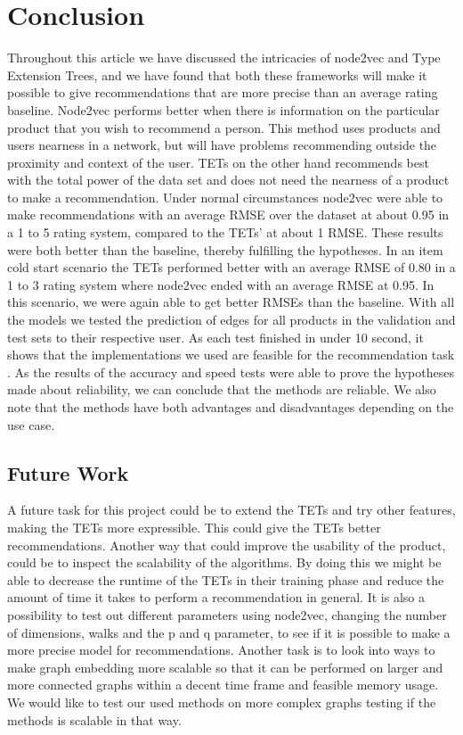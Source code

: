 \section{Conclusion}
Throughout this article we have discussed the intricacies of node2vec and Type Extension Trees, and we have found that both these frameworks will make it possible to give recommendations that are more precise than an average rating baseline.
Node2vec performs better when there is information on the particular product that you wish to recommend a person.
This method uses products and users nearness in a network, but will have problems recommending outside the proximity and context of the user.
TETs on the other hand recommends best with the total power of the data set and does not need the nearness of a product to make a recommendation.
Under normal circumstances node2vec were able to make recommendations with an average RMSE over the dataset at about 0.95 in a 1 to 5 rating system, compared to the TETs' at about 1 RMSE.
These results were both better than the baseline, thereby fulfilling the hypotheses.
In an item cold start scenario the TETs performed better with an average RMSE of 0.80 in a 1 to 3 rating system where node2vec ended with an average RMSE at 0.95.
In this scenario, we were again able to get better RMSEs than the baseline.
With all the models we tested  the prediction of edges for all products in the validation and test sets to their respective user.
As each test finished in under 10 second, it shows that the implementations we used are feasible for the recommendation task .
As the results of the accuracy and speed tests were able to prove the hypotheses made about reliability, we can conclude that the methods are reliable.
We also note that the methods have both advantages and disadvantages depending on the use case. 

\subsection{Future Work}
A future task for this project could be to extend the TETs and try other features, making the TETs more expressible. This could give the TETs better recommendations.
Another way that could improve the usability of the product, could be to inspect the scalability of the algorithms.
By doing this we might be able to decrease the runtime of the TETs in their training phase and reduce the amount of time it takes to perform a recommendation in general.
It is also a possibility to test out different parameters using node2vec, changing the number of dimensions, walks and the p and q parameter, to see if it is possible to make a more precise model for recommendations.
Another task is to look into ways to make graph embedding more scalable so that it can be performed on larger and more connected graphs within a decent time frame and feasible memory usage. 
We would like to test our used methods on more complex graphs testing if the methods is scalable in that way.
